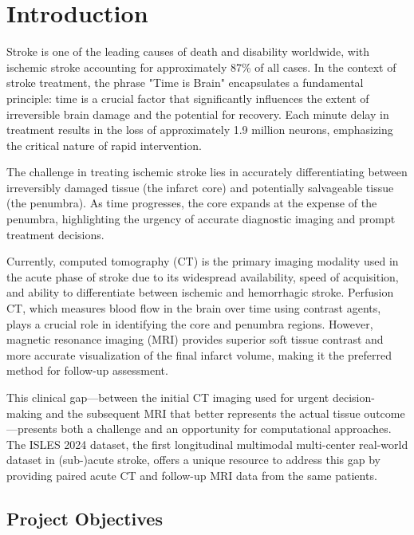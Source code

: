 
\chapter{Introduction}\label{chapter:introduction}

Stroke is one of the leading causes of death and disability worldwide, with ischemic stroke accounting for approximately 87\% of all cases. In the context of stroke treatment, the phrase "Time is Brain" encapsulates a fundamental principle: time is a crucial factor that significantly influences the extent of irreversible brain damage and the potential for recovery. Each minute delay in treatment results in the loss of approximately 1.9 million neurons, emphasizing the critical nature of rapid intervention.

The challenge in treating ischemic stroke lies in accurately differentiating between irreversibly damaged tissue (the infarct core) and potentially salvageable tissue (the penumbra). As time progresses, the core expands at the expense of the penumbra, highlighting the urgency of accurate diagnostic imaging and prompt treatment decisions.

Currently, computed tomography (CT) is the primary imaging modality used in the acute phase of stroke due to its widespread availability, speed of acquisition, and ability to differentiate between ischemic and hemorrhagic stroke. Perfusion CT, which measures blood flow in the brain over time using contrast agents, plays a crucial role in identifying the core and penumbra regions. However, magnetic resonance imaging (MRI) provides superior soft tissue contrast and more accurate visualization of the final infarct volume, making it the preferred method for follow-up assessment.

This clinical gap—between the initial CT imaging used for urgent decision-making and the subsequent MRI that better represents the actual tissue outcome—presents both a challenge and an opportunity for computational approaches. The ISLES 2024 dataset, the first longitudinal multimodal multi-center real-world dataset in (sub-)acute stroke, offers a unique resource to address this gap by providing paired acute CT and follow-up MRI data from the same patients.

\section{Project Objectives}

